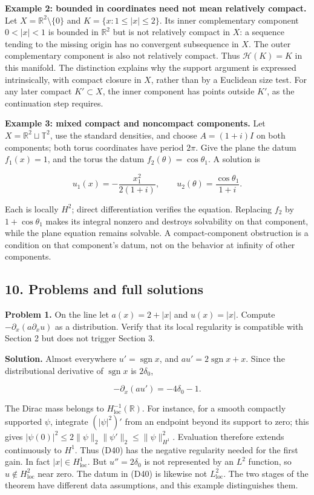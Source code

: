 \documentclass[
  11pt,
]{article}
\begin{document}
\textbf{Example 2: bounded in coordinates need not mean relatively
compact.} Let \(X=\mathbb R^2\setminus\{0\}\) and
\(K=\{x:1\leq|x|\leq2\}\). Its inner complementary component \(0<|x|<1\)
is bounded in \(\mathbb R^2\) but is not relatively compact in \(X\): a
sequence tending to the missing origin has no convergent subsequence in
\(X\). The outer complementary component is also not relatively compact.
Thus \(\mathcal H(K)=K\) in this manifold. The distinction explains why
the support argument is expressed intrinsically, with compact closure in
\(X\), rather than by a Euclidean size test. For any later compact
\(K'\subset X\), the inner component has points outside \(K'\), as the
continuation step requires.

\textbf{Example 3: mixed compact and noncompact components.} Let
\(X=\mathbb R^2\sqcup\mathbb T^2\), use the standard densities, and
choose \(A=(1+i)I\) on both components; both torus coordinates have
period \(2\pi\). Give the plane the datum \(f_1(x)=1\), and the torus
the datum \(f_2(\theta)=\cos\theta_1\). A solution is

\[
 u_1(x)=-\frac{x_1^2}{2(1+i)},\qquad
 u_2(\theta)=\frac{\cos\theta_1}{1+i}.                            \tag{D39}
\]

Each is locally \(H^2\); direct differentiation verifies the equation.
Replacing \(f_2\) by \(1+\cos\theta_1\) makes its integral nonzero and
destroys solvability on that component, while the plane equation remains
solvable. A compact-component obstruction is a condition on that
component's datum, not on the behavior at infinity of other components.

\subsection{10. Problems and full
solutions}\label{problems-and-full-solutions}

\textbf{Problem 1.} On the line let \(a(x)=2+|x|\) and \(u(x)=|x|\).
Compute \(-\partial_x(a\partial_xu)\) as a distribution. Verify that its
local regularity is compatible with Section 2 but does not trigger
Section 3.

\textbf{Solution.} Almost everywhere \(u'=\operatorname{sgn}x\), and
\(au'=2\operatorname{sgn}x+x\). Since the distributional derivative of
\(\operatorname{sgn}x\) is \(2\delta_0\),

\[
                       -\partial_x(au')=-4\delta_0-1.           \tag{D40}
\]

The Dirac mass belongs to \(H^{-1}_{\mathrm{loc}}(\mathbb R)\). For
instance, for a smooth compactly supported \(\psi\), integrate
\((|\psi|^2)'\) from an endpoint beyond its support to zero; this gives
\(|\psi(0)|^2\leq2\|\psi\|_2\|\psi'\|_2\leq\|\psi\|_{H^1}^2\).
Evaluation therefore extends continuously to \(H^1\). Thus (D40) has the
negative regularity needed for the first gain. In fact
\(|x|\in H^1_{\mathrm{loc}}\). But \(u''=2\delta_0\) is not represented
by an \(L^2\) function, so \(u\notin H^2_{\mathrm{loc}}\) near zero. The
datum in (D40) is likewise not \(L^2_{\mathrm{loc}}\). The two stages of
the theorem have different data assumptions, and this example
distinguishes them.
\end{document}
